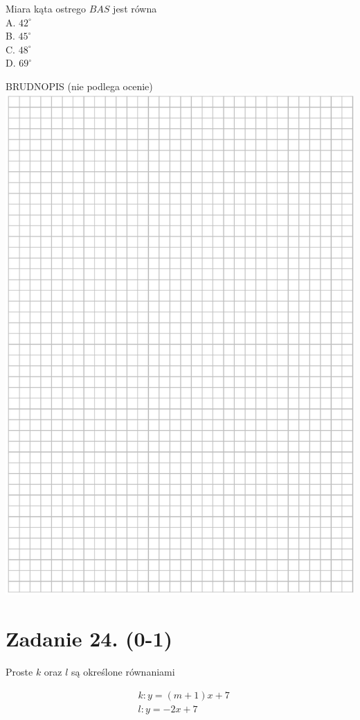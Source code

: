 \documentclass[10pt]{article}
\begin{document}
Miara kąta ostrego \(B A S\) jest równa\\
A. \(42^{\circ}\)\\
B. \(45^{\circ}\)\\
C. \(48^{\circ}\)\\
D. \(69^{\circ}\)

BRUDNOPIS (nie podlega ocenie)\\
\includegraphics[max width=\textwidth, center]{2024_11_21_0a35d272448d5080a489g-17}

\section*{Zadanie 24. (0-1)}
Proste \(k\) oraz \(l\) są określone równaniami

\[
\begin{aligned}
& k: y=(m+1) x+7 \\
& l: y=-2 x+7
\end{aligned}
\]
\end{document}
